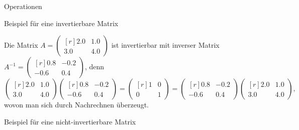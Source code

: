 \documentclass[
  8pt,
  ignorenonframetext,
]{beamer}
\begin{document}
\begin{frame}{Operationen}
\protect\hypertarget{operationen-25}{}
\small

Beispiel für eine invertierbare Matrix \footnotesize

Die Matrix
\(A = \begin{pmatrix*}[r] 2.0 & 1.0 \\ 3.0 & 4.0 \end{pmatrix*}\) ist
invertierbar mit inverser Matrix
\(A^{-1} = \begin{pmatrix*}[r] 0.8 & -0.2 \\ -0.6 & 0.4 \end{pmatrix*}\),
denn \begin{equation}
\begin{pmatrix*}[r] 2.0 &  1.0 \\   3.0 & 4.0 \end{pmatrix*}
\begin{pmatrix*}[r] 0.8 & -0.2 \\  -0.6 & 0.4 \end{pmatrix*}
=
\begin{pmatrix*}[r] 1 & 0 \\ 0 & 1 \end{pmatrix*}
=
\begin{pmatrix*}[r] 0.8 & -0.2  \\  -0.6 & 0.4 \end{pmatrix*}
\begin{pmatrix*}[r] 2.0 &  1.0  \\   3.0 & 4.0 \end{pmatrix*},
\end{equation} wovon man sich durch Nachrechnen überzeugt. \vspace{3mm}

\small

Beispiel für eine nicht-invertierbare Matrix \footnotesize


\end{frame}
\end{document}
